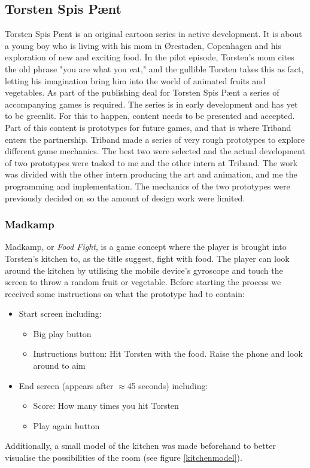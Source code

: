 \subsection{Torsten Spis P{{\ae}}nt}
Torsten Spis P{\ae}nt is an original cartoon series in active development. It is about a young boy who is living with his mom in {\O}restaden, Copenhagen and his exploration of new and exciting food. In the pilot episode, Torsten's mom cites the old phrase "you are what you eat," and the gullible Torsten takes this as fact, letting his imagination bring him into the world of animated fruits and vegetables. \newline
As part of the publishing deal for Torsten Spis P{\ae}nt a series of accompanying games is required. The series is in early development and has yet to be greenlit. For this to happen, content needs to be presented and accepted. Part of this content is prototypes for future games, and that is where Triband enters the partnership. Triband made a series of very rough prototypes to explore different game mechanics. The best two were selected and the actual development of two prototypes were tasked to me and the other intern at Triband. The work was divided with the other intern producing the art and animation, and me the programming and implementation. The mechanics of the two prototypes were previously decided on so the amount of design work were limited.

\subsubsection{Madkamp}
Madkamp, or \textit{Food Fight}, is a game concept where the player is brought into Torsten's kitchen to, as the title suggest, fight with food. The player can look around the kitchen by utilising the mobile device's gyroscope and touch the screen to throw a random fruit or vegetable. \newline
Before starting the process we received some instructions on what the prototype had to contain:
\begin{itemize}
  \item Start screen including:
  \begin{itemize}
    \item Big play button
    \item Instructions button: Hit Torsten with the food. Raise the phone and look around to aim
  \end{itemize}
  \item End screen (appears after $\approx$45 seconds) including:
  \begin{itemize}
    \item Score: How many times you hit Torsten
    \item Play again button
  \end{itemize}
\end{itemize}
Additionally, a small model of the kitchen was made beforehand to better visualise the possibilities of the room (see figure \ref{kitchenmodel}).

